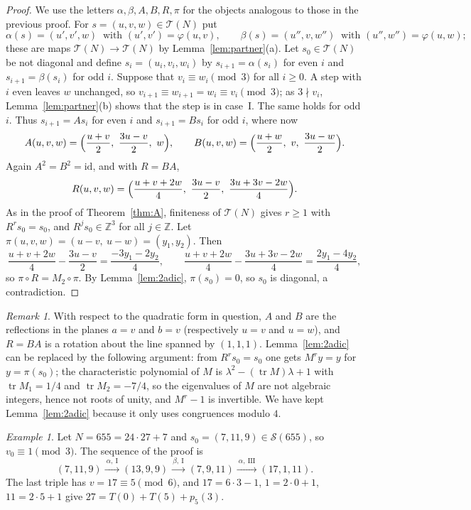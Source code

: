 \documentclass[11pt]{amsart}
\theoremstyle{definition}
\theoremstyle{remark}
\newtheorem{remark}[theorem]{Remark}
\newtheorem{example}[theorem]{Example}
\newcommand{\Z}{\mathbb{Z}}
\newcommand{\cS}{\mathcal{S}}
\newcommand{\cT}{\mathcal{T}}
\newcommand{\Tr}{T}
\begin{document}
\begin{proof}
We use the letters $\alpha,\beta,A,B,R,\pi$ for the objects analogous to those in the previous proof.
For $s=(u,v,w)\in\cT(N)$ put
\[
\alpha(s)=(u',v',w)\ \text{ with } (u',v')=\varphi(u,v),\qquad
\beta(s)=(u'',v,w'')\ \text{ with } (u'',w'')=\varphi(u,w);
\]
these are maps $\cT(N)\to\cT(N)$ by Lemma~\ref{lem:partner}(a).
Let $s_0\in\cT(N)$ be not diagonal and define $s_i=(u_i,v_i,w_i)$ by $s_{i+1}=\alpha(s_i)$ for even $i$ and $s_{i+1}=\beta(s_i)$ for odd $i$.
Suppose that $v_i\equiv w_i\pmod 3$ for all $i\ge 0$.
A step with $i$ even leaves $w$ unchanged, so $v_{i+1}\equiv w_{i+1}=w_i\equiv v_i\pmod 3$;
as $3\nmid v_i$, Lemma~\ref{lem:partner}(b) shows that the step is in case~I. The same holds for odd $i$.
Thus $s_{i+1}=As_i$ for even $i$ and $s_{i+1}=Bs_i$ for odd $i$, where now
\[
A(u,v,w)=\Bigl(\frac{u+v}{2},\ \frac{3u-v}{2},\ w\Bigr),\qquad
B(u,v,w)=\Bigl(\frac{u+w}{2},\ v,\ \frac{3u-w}{2}\Bigr).
\]
Again $A^2=B^2=\mathrm{id}$, and with $R=BA$,
\[
R(u,v,w)=\Bigl(\frac{u+v+2w}{4},\ \frac{3u-v}{2},\ \frac{3u+3v-2w}{4}\Bigr).
\]
As in the proof of Theorem~\ref{thm:A}, finiteness of $\cT(N)$ gives $r\ge 1$ with $R^rs_0=s_0$, and $R^js_0\in\Z^3$ for all $j\in\Z$.
Let $\pi(u,v,w)=(u-v,\ u-w)=(y_1,y_2)$. Then
\[
\frac{u+v+2w}{4}-\frac{3u-v}{2}=\frac{-3y_1-2y_2}{4},\qquad
\frac{u+v+2w}{4}-\frac{3u+3v-2w}{4}=\frac{2y_1-4y_2}{4},
\]
so $\pi\circ R=M_2\circ\pi$. By Lemma~\ref{lem:2adic}, $\pi(s_0)=0$, so $s_0$ is diagonal, a contradiction.
\end{proof}

\begin{remark}\label{rem:rotation}
With respect to the quadratic form in question, $A$ and $B$ are the reflections in the planes $a=v$ and $b=v$
(respectively $u=v$ and $u=w$), and $R=BA$ is a rotation about the line spanned by $(1,1,1)$.
Lemma~\ref{lem:2adic} can be replaced by the following argument: from $R^rs_0=s_0$ one gets $M^ry=y$ for $y=\pi(s_0)$;
the characteristic polynomial of $M$ is $\lambda^2-(\operatorname{tr}M)\lambda+1$ with $\operatorname{tr}M_1=1/4$ and $\operatorname{tr}M_2=-7/4$,
so the eigenvalues of $M$ are not algebraic integers, hence not roots of unity, and $M^r-1$ is invertible.
We have kept Lemma~\ref{lem:2adic} because it only uses congruences modulo $4$.
\end{remark}

\begin{example}\label{ex:walk}
Let $N=655=24\cdot 27+7$ and $s_0=(7,11,9)\in\cS(655)$, so $v_0\equiv 1\pmod 3$. The sequence of the proof is
\[
(7,11,9)\xrightarrow{\ \alpha,\ \mathrm{I}\ }(13,9,9)\xrightarrow{\ \beta,\ \mathrm{I}\ }(7,9,11)
\xrightarrow{\ \alpha,\ \mathrm{III}\ }(17,1,11).
\]
The last triple has $v=17\equiv 5\pmod 6$, and $17=6\cdot 3-1$, $1=2\cdot 0+1$, $11=2\cdot 5+1$ give
$27=\Tr(0)+\Tr(5)+p_5(3)$.
\end{example}
\end{document}
